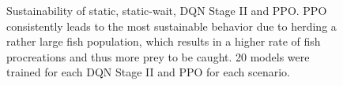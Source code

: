 \documentclass[letterpaper]{article}
\begin{document}
\begin{figure}%
    \centering
    \caption{Sustainability of static, static-wait, DQN Stage II and PPO. PPO consistently leads to the most sustainable behavior due to herding a rather large fish population, which results in a higher rate of fish procreations and thus more prey to be caught. 20 models were trained for each DQN Stage II and PPO for each scenario.}
    \label{fig:dqncomp}%
\end{figure}
\end{document}
